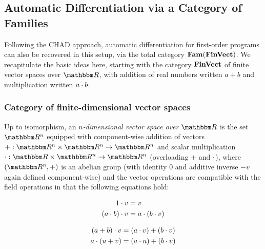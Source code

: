 \subsection{Automatic Differentiation via a Category of Families}

Following the CHAD approach, automatic differentiation for first-order programs can also be recovered in this
setup, via the total category $\mathbf{Fam}(\mathbf{FinVect})$. We recapitulate the basic ideas here, starting with the
category $\mathbf{FinVect}$ of finite vector spaces over $\RR$, with addition of real numbers written $a + b$ and
multiplication written $a \cdot b$.

\subsubsection{Category of finite-dimensional vector spaces}
\label{sec:categories-with-biproducts:fdvect}

\begin{definition}
Up to isomorphism, an \emph{$n$-dimensional vector space over $\RR$} is the set $\RR^n$ equipped with
component-wise addition of vectors $+: \RR^n \times \RR^n \to \RR^n$ and scalar multiplication $\mult: \RR
\times \RR^n \to \RR^n$ (overloading $+$ and $\cdot$), where $(\RR^n,+)$ is an abelian group (with identity
$0$ and additive inverse $-v$ again defined component-wise) and the vector operations are compatible with the
field operations in that the following equations hold:

\vspace{-4mm}
\begin{minipage}[t]{0.45\textwidth}
\begin{center}
\begin{align*}
   1 \cdot v &= v \\
   (a \cdot b) \cdot v &= a \cdot (b \cdot v)
\end{align*}
\end{center}
\end{minipage}%
\begin{minipage}[t]{0.45\textwidth}
\begin{center}
\begin{align*}
   (a + b) \cdot v &= (a \cdot v) + (b \cdot v) \\
   a \cdot (u + v) &= (a \cdot u) + (b \cdot v)
\end{align*}
\end{center}
\end{minipage}
\end{definition}

